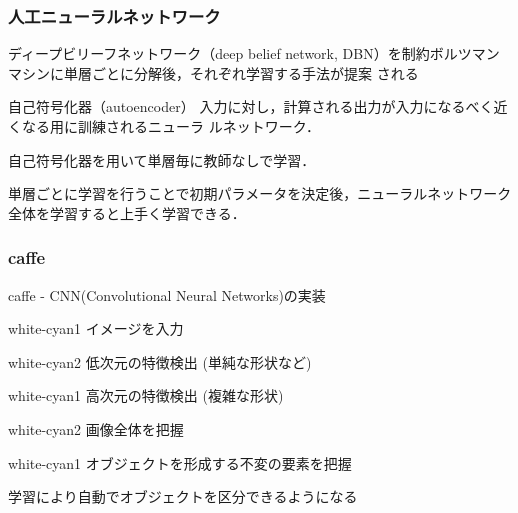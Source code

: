 \documentclass[dvipdfmx,11pt,notheorems]{beamer}
\theoremstyle{definition}
\begin{document}
\begin{frame}[fragile]\frametitle{人工ニューラルネットワーク}
ディープビリーフネットワーク（deep belief network, DBN）を制約ボルツマン
 マシンに単層ごとに分解後，それぞれ学習する手法が提案
 される
\begin{block}{自己符号化器（autoencoder）}
入力に対し，計算される出力が入力になるべく近くなる用に訓練されるニューラ
 ルネットワーク．
\end{block}

自己符号化器を用いて単層毎に教師なしで学習．

\vspace{1cm}

単層ごとに学習を行うことで初期パラメータを決定後，ニューラルネットワーク
 全体を学習すると上手く学習できる．

\end{frame}


\begin{frame}[fragile]\frametitle{caffe}
 caffe - CNN(Convolutional Neural Networks)の実装
\vspace{0.2cm}

\hfill
\begin{beamercolorbox}[ center, wd=60mm, sep=2pt, shadow=false, rounded=true ]{white-cyan1}
 イメージを入力
\end{beamercolorbox}
\hfill\hfill

\vspace{0.2cm}

\hfill
\begin{beamercolorbox}[ center, wd=60mm, sep=2pt, shadow=false, rounded=true ]{white-cyan2}
低次元の特徴検出 (単純な形状など)
\end{beamercolorbox}
\hfill\hfill

\vspace{0.2cm}

\hfill
\begin{beamercolorbox}[ center, wd=60mm, sep=2pt, shadow=false, rounded=true ]{white-cyan1}
高次元の特徴検出 (複雑な形状)
\end{beamercolorbox}
\hfill\hfill

\vspace{0.2cm}

\hfill
\begin{beamercolorbox}[ center, wd=60mm, sep=2pt, shadow=false, rounded=true ]{white-cyan2}
画像全体を把握
\end{beamercolorbox}
\hfill\hfill

\vspace{0.2cm}

\hfill
\begin{beamercolorbox}[ center, wd=80mm, sep=2pt, shadow=false, rounded=true ]{white-cyan1}
オブジェクトを形成する不変の要素を把握
\end{beamercolorbox}
\hfill\hfill

\vspace{0.2cm}

学習により自動でオブジェクトを区分できるようになる
\end{frame}
\end{document}
